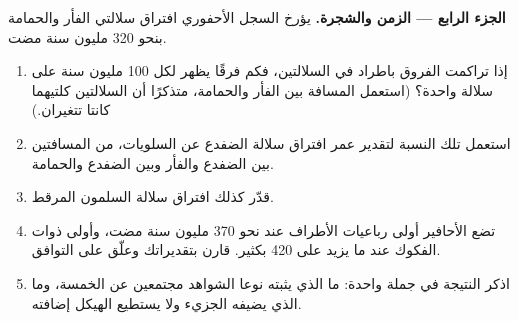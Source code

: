 \begin{problem}
\medskip
\noindent\textbf{الجزء الرابع --- الزمن والشجرة.}
يؤرخ السجل الأحفوري افتراق سلالتي الفأر والحمامة بنحو 320 مليون سنة
مضت.
\begin{enumerate}[resume]
  \item إذا تراكمت الفروق باطراد في السلالتين، فكم فرقًا يظهر لكل 100
        مليون سنة على سلالة واحدة؟ (استعمل المسافة بين الفأر
        والحمامة، متذكرًا أن السلالتين كلتيهما كانتا تتغيران.)
  \item استعمل تلك النسبة لتقدير عمر افتراق سلالة الضفدع عن السلويات،
        من المسافتين بين الضفدع والفأر وبين الضفدع والحمامة.
  \item قدّر كذلك افتراق سلالة السلمون المرقط.
  \item تضع الأحافير أولى رباعيات الأطراف عند نحو 370 مليون سنة مضت،
        وأولى  ذوات الفكوك عند ما يزيد على 420 بكثير. قارن
        بتقديراتك وعلّق على التوافق.
  \item اذكر النتيجة في جملة واحدة: ما الذي يثبته نوعا الشواهد
        مجتمعين عن  الخمسة، وما الذي يضيفه الجزيء ولا يستطيع
        الهيكل إضافته.
\end{enumerate}
\end{problem}
